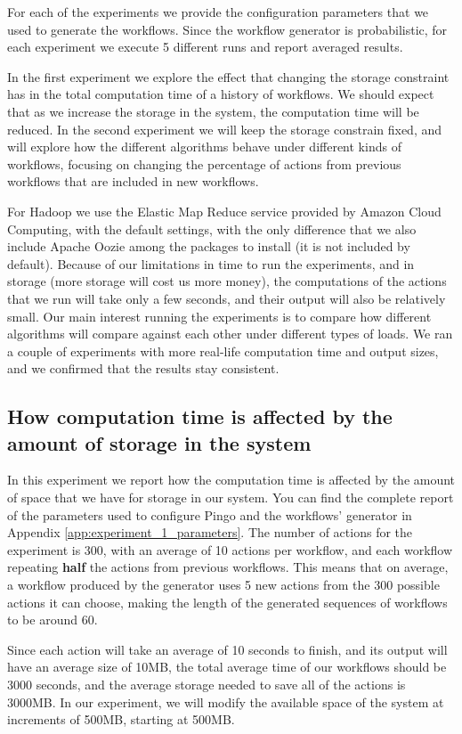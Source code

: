 For each of the experiments we provide the configuration parameters that we used to generate the workflows.  Since the workflow generator is probabilistic, for each experiment we execute 5 different runs and report averaged results.

In the first experiment we explore the effect that changing the storage constraint has in the total computation time of a history of workflows.  We should expect that as we increase the storage in the system, the computation time will be reduced.  In the second experiment we will keep the storage constrain fixed, and will explore how the different algorithms behave under different kinds of workflows, focusing on changing the percentage of actions from previous workflows that are included in new workflows.

For Hadoop we use the Elastic Map Reduce service provided by Amazon Cloud Computing, with the default settings, with the only difference that we also include Apache Oozie among the packages to install (it is not included by default).  Because of our limitations in time to run the experiments, and in storage (more storage will cost us more money), the computations of the actions that we run will take only a few seconds, and their output will also be relatively small.  Our main interest running the experiments is to compare how different algorithms will compare against each other under different types of loads.  We ran a couple of experiments with more real-life computation time and output sizes, and we confirmed that the results stay consistent.

\subsection{How computation time is affected by the amount of storage in the system}
In this experiment we report how the computation time is affected by the amount of space that we have for storage in our system.  You can find the complete report of the parameters used to configure Pingo and the workflows' generator in Appendix \ref{app:experiment_1_parameters}.  The number of actions for the experiment is 300, with an average of 10 actions per workflow, and each workflow repeating \textbf{half} the actions from previous workflows.  This means that on average, a workflow produced by the generator uses 5 new actions from the 300 possible actions it can choose, making the length of the generated sequences of workflows to be around 60.

Since each action will take an average of 10 seconds to finish, and its output will have an average size of 10MB, the total average time of our workflows should be 3000 seconds, and the average storage needed to save all of the actions is 3000MB.  In our experiment, we will modify the available space of the system at increments of 500MB, starting at 500MB.

